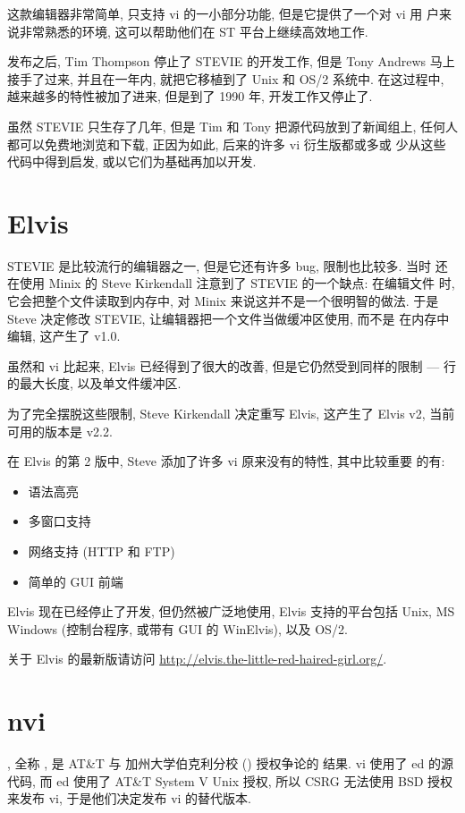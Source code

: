 这款编辑器非常简单, 只支持 vi 的一小部分功能, 但是它提供了一个对 vi 用
户来说非常熟悉的环境, 这可以帮助他们在 ST 平台上继续高效地工作.

发布之后, Tim Thompson 停止了 STEVIE 的开发工作, 但是 Tony Andrews 马上
接手了过来, 并且在一年内, 就把它移植到了 Unix 和 OS/2 系统中. 在这过程中,
越来越多的特性被加了进来, 但是到了 1990 年, 开发工作又停止了.

虽然 STEVIE 只生存了几年, 但是 Tim 和 Tony 把源代码放到了新闻组上,
任何人都可以免费地浏览和下载, 正因为如此, 后来的许多 vi 衍生版都或多或
少从这些代码中得到启发, 或以它们为基础再加以开发.

\section{Elvis}
\label{sec:elvis}
STEVIE 是比较流行的编辑器之一, 但是它还有许多 bug, 限制也比较多. 当时 
还在使用 Minix 的 Steve Kirkendall 注意到了 STEVIE 的一个缺点: 在编辑文件
时, 它会把整个文件读取到内存中, 对 Minix 来说这并不是一个很明智的做法.
于是 Steve 决定修改 STEVIE, 让编辑器把一个文件当做缓冲区使用, 而不是
在内存中编辑, 这产生了  v1.0.

虽然和 vi 比起来, Elvis 已经得到了很大的改善, 但是它仍然受到同样的限制
--- 行的最大长度, 以及单文件缓冲区.

为了完全摆脱这些限制, Steve Kirkendall 决定重写 Elvis, 这产生了 Elvis
v2, 当前可用的版本是 v2.2.

在 Elvis 的第 2 版中, Steve 添加了许多 vi 原来没有的特性, 其中比较重要
的有:
\begin{itemize}
\item 语法高亮
\item 多窗口支持
\item 网络支持 (HTTP 和 FTP)
\item 简单的 GUI 前端
\end{itemize}
Elvis 现在已经停止了开发, 但仍然被广泛地使用, Elvis 支持的平台包括
Unix, MS Windows (控制台程序, 或带有 GUI 的 WinElvis), 以及 OS/2.
\begin{warning}
关于 Elvis 的最新版请访问
\url{http://elvis.the-little-red-haired-girl.org/}.
\end{warning}

\section{nvi}
\label{sec:nvi}
, 全称 , 是 AT\&T 与 加州大学伯克利分校 
 () 授权争论的
结果. vi 使用了 ed 的源代码, 而 ed 使用了 AT\&T System V Unix 授权,
所以 CSRG 无法使用 BSD 授权来发布 vi, 于是他们决定发布 vi 的替代版本.

